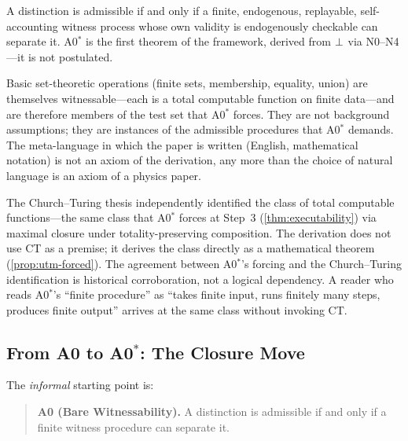 \begin{theorem}
\label{thm:a0star-derived}
A distinction is admissible if and only if a finite, endogenous,
replayable, self-accounting witness process whose own validity is
endogenously checkable can separate it.  A0$^*$ is the first theorem of
the framework, derived from $\bot$ via N0--N4---it is not postulated.
\end{theorem}

\begin{remark}
\label{rem:set-theory}
Basic set-theoretic operations (finite sets, membership, equality, union)
are themselves witnessable---each is a total computable function on finite
data---and are therefore members of the test set that A0$^*$ forces.  They are
not background assumptions; they are instances of the admissible procedures
that A0$^*$ demands.  The meta-language in which the paper is written (English,
mathematical notation) is not an axiom of the derivation, any more than
the choice of natural language is an axiom of a physics paper.
\end{remark}

\begin{remark}
\label{rem:ct-status}
The Church--Turing thesis \citep{church1936,turing1936} independently
identified the class of total computable functions---the same class that
A0$^*$ forces at Step~3 (\cref{thm:executability}) via maximal closure under
totality-preserving composition.  The derivation does not use CT as a
premise; it derives the class directly as a mathematical theorem
(\cref{prop:utm-forced}).  The agreement between A0$^*$'s forcing and the
Church--Turing identification is historical corroboration, not a logical
dependency.  A reader who reads A0$^*$'s ``finite procedure'' as ``takes
finite input, runs finitely many steps, produces finite output'' arrives
at the same class without invoking CT.
\end{remark}

\subsection{From A0 to A0$^*$: The Closure Move}
\label{sec:axioms:closure-move}

The \emph{informal} starting point is:

\begin{quote}
\textbf{A0 (Bare Witnessability).}  A distinction is admissible if and only
if a finite witness procedure can separate it.
\end{quote}

